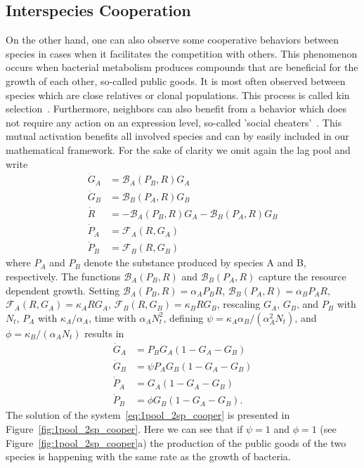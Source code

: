 \documentclass[10pt,A4paper]{article}
\numberwithin{equation}{section}
\begin{document}
\subsection{Interspecies Cooperation}
On the other hand, one can also observe some cooperative behaviors between species in cases when it facilitates the competition with others.
This phenomenon occurs when bacterial metabolism produces compounds that are beneficial for the growth of each other, so-called public goods.
It is most often observed between species which are close relatives or clonal populations.
This process is called kin selection~\cite{west_social_2007}.
Furthermore, neighbors can also benefit from a behavior which does not require any action on an expression level, so-called 'social cheaters'~\cite{rainey_evolution_2003}.
This mutual activation benefits all involved species and can by easily included in our mathematical framework.
For the sake of clarity we omit again the lag pool and write
\begin{align}
    \dot{G}_A &= \mathcal{B}_A(P_B,R)G_A\\
    \dot{G}_B &= \mathcal{B}_B(P_A,R)G_B\\
    \dot{R} &=-\mathcal{B}_A(P_B,R)G_A-\mathcal{B}_B(P_A,R)G_B\\
    \dot{P}_A &= \mathcal{F}_A(R,G_A)\\
    \dot{P}_B &= \mathcal{F}_B(R,G_B)
\end{align}
where $P_A$ and $P_B$ denote the substance produced by species A and B, respectively.
The functions $\mathcal{B}_A(P_B,R)$ and $\mathcal{B}_B(P_A,R)$ capture the resource dependent growth.
Setting $\mathcal{B}_A(P_B,R)=\alpha_A P_BR$, $\mathcal{B}_B(P_A,R)=\alpha_B P_A R$, $\mathcal{F}_A(R,G_A)=\kappa_A RG_A$, $\mathcal{F}_B(R,G_B)=\kappa_B RG_B$, rescaling $G_A$, $G_B$, and $P_B$ with $N_t$, $P_A$ with $\kappa_A/\alpha_A$, time with $\alpha_AN_t^2$, defining $\psi=\kappa_A\alpha_B/(\alpha_A^2N_t)$, and $\phi=\kappa_B/(\alpha_A N_t)$ results in
\begin{align}
    \dot{G}_A &= P_B G_A\left(1 - G_A-G_B\right)\\
    \dot{G}_B &= \psi P_A G_B\left(1 - G_A-G_B\right)\\
    \dot{P}_A &= G_A\left(1 - G_A-G_B\right)\\
    \dot{P}_B &=\phi G_B\left(1 - G_A-G_B\right).
    \label{eq:1pool_2sp_cooper}
\end{align}
%
The solution of the system~\ref{eq:1pool_2sp_cooper} is presented in Figure~\ref{fig:1pool_2sp_cooper}.
Here we can see that if $\psi=1$ and $\phi=1$ (see Figure~\ref{fig:1pool_2sp_cooper}a) the production of the public goods of the two species is happening with the same rate as the growth of bacteria.
\end{document}
